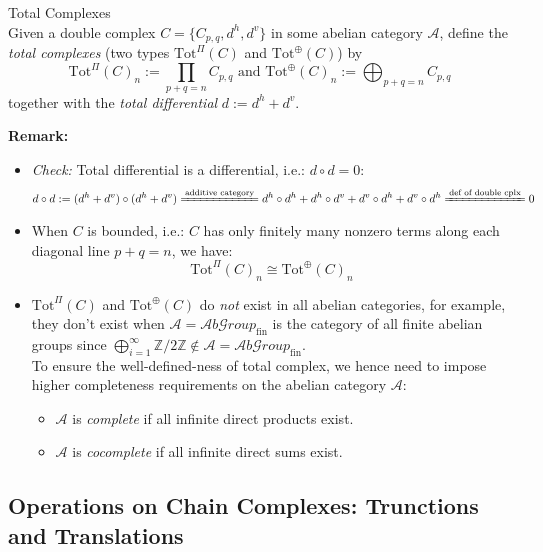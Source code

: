 \begin{definition}{Total Complexes}\\
Given a double complex $C= \{C_{p,q} ,d^h,d^v\}$ in some abelian category $\mathcal{A}$, define the \textit{total complexes} (two types $\text{Tot}^\Pi (C)$ and $\text{Tot}^\oplus (C)$) by
\[
\text{Tot}^\Pi (C)_n:= \prod_{p+q=n} C_{p,q} \text{ and } \text{Tot}^\oplus (C)_n:= \bigoplus_{p+q=n} C_{p,q}
\]
together with the \textit{total differential} $d:= d^h+d^v$.
\end{definition}

\noindent\textbf{Remark:} \begin{itemize}
    \item \textit{Check:} Total differential is a differential, i.e.: $d\circ d=0$:
    \begin{align*}
        d \circ d:= (d^h+d^v) \circ (d^h+d^v) \xlongequal{\text{additive category}} d^h \circ d^h +d^h \circ d^v +d^v \circ d^h +d^v \circ d^h \xlongequal{\text{def of double cplx}}0
    \end{align*}

    \item When $C$ is bounded, i.e.: $C$ has only finitely many nonzero terms along each diagonal line $p+q=n$, we have:
    \[
    \text{Tot}^\Pi(C)_n \cong \text{Tot}^\oplus (C)_n
    \]

    \item $\text{Tot}^\Pi (C)$ and $\text{Tot}^\oplus (C)$ do \textit{not} exist in all abelian categories, for example, they don't exist when $\mathcal{A}= \mathcal{A}b\mathcal{G}roup_{\text{fin}}$ is the category of all finite abelian groups since $\bigoplus_{i=1}^\infty \mathbb{Z}/ 2\mathbb{Z} \notin \mathcal{A}= \mathcal{A}b\mathcal{G}roup_{\text{fin}}$.\\
    To ensure the well-defined-ness of total complex, we hence need to impose higher completeness requirements on the abelian category $\mathcal{A}$:
    \begin{itemize}
        \item $\mathcal{A}$ is \textit{complete} if all infinite direct products exist.
        \item $\mathcal{A}$ is \textit{cocomplete} if all infinite direct sums exist.
    \end{itemize}
\end{itemize}

\subsection{Operations on Chain Complexes: Trunctions and Translations}

